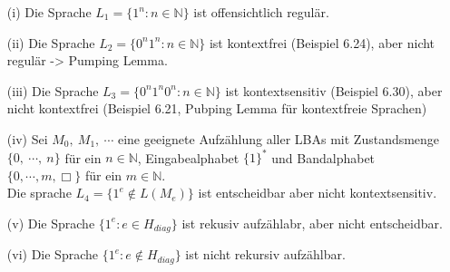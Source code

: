 \begin{itemize}
    \item [(i)] Die Sprache \(L_1 = \{1^n : n\in \mathbb{N}\}\) ist offensichtlich regulär.
    \item [(ii)] Die Sprache \(L_2 = \{0^n1^n: n \in \mathbb{N}\}\) ist kontextfrei (Beispiel 6.24), aber nicht regulär -> Pumping Lemma.
    \item [(iii)] Die Sprache \(L_3 = \{0^n 1^n 0^n: n \in \mathbb
    N\}\) ist kontextsensitiv (Beispiel 6.30), aber nicht kontextfrei (Beispiel 6.21, Pubping Lemma für kontextfreie Sprachen)
    \item [(iv)] Sei \(M_0,\ M_1,\ \cdots\) eine geeignete Aufzählung aller LBAs mit Zustandsmenge \(\{0,\ \cdots,\ n\}\) für ein \(n \in \mathbb{N}\), Eingabealphabet \(\{1\}^*\) und Bandalphabet \( \{0, \cdots, m, \Box \} \) für ein \(m \in \mathbb{N}\). \\Die sprache \(L_4 = \{1^e \not \in L(M_e)\}\) ist entscheidbar aber nicht kontextsensitiv.
    \item [(v)] Die Sprache \(\{1^e:e\in H_{diag}\}\) ist rekusiv aufzählabr, aber nicht entscheidbar.
    \item [(vi)] Die Sprache \(\{1^e : e \not \in H_{diag}\}\) ist nicht rekursiv aufzählbar.
\end{itemize}